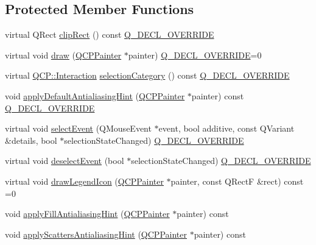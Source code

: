 \subsection*{Protected Member Functions}
\begin{DoxyCompactItemize}
\item 
virtual Q\+Rect \mbox{\hyperlink{class_q_c_p_abstract_plottable_a635cee3effc07ad421414c76fd83548c}{clip\+Rect}} () const \mbox{\hyperlink{qcustomplot_8h_a42cc5eaeb25b85f8b52d2a4b94c56f55}{Q\+\_\+\+D\+E\+C\+L\+\_\+\+O\+V\+E\+R\+R\+I\+DE}}
\item 
virtual void \mbox{\hyperlink{class_q_c_p_abstract_plottable_a453f676a5cee7bf846c5f0fa05ea84b3}{draw}} (\mbox{\hyperlink{class_q_c_p_painter}{Q\+C\+P\+Painter}} $\ast$painter) \mbox{\hyperlink{qcustomplot_8h_a42cc5eaeb25b85f8b52d2a4b94c56f55}{Q\+\_\+\+D\+E\+C\+L\+\_\+\+O\+V\+E\+R\+R\+I\+DE}}=0
\item 
virtual \mbox{\hyperlink{namespace_q_c_p_a2ad6bb6281c7c2d593d4277b44c2b037}{Q\+C\+P\+::\+Interaction}} \mbox{\hyperlink{class_q_c_p_abstract_plottable_af80ad8531642e786b6f4fad551c203c4}{selection\+Category}} () const \mbox{\hyperlink{qcustomplot_8h_a42cc5eaeb25b85f8b52d2a4b94c56f55}{Q\+\_\+\+D\+E\+C\+L\+\_\+\+O\+V\+E\+R\+R\+I\+DE}}
\item 
void \mbox{\hyperlink{class_q_c_p_abstract_plottable_ac032077fb0db93d6faa3273d02363398}{apply\+Default\+Antialiasing\+Hint}} (\mbox{\hyperlink{class_q_c_p_painter}{Q\+C\+P\+Painter}} $\ast$painter) const \mbox{\hyperlink{qcustomplot_8h_a42cc5eaeb25b85f8b52d2a4b94c56f55}{Q\+\_\+\+D\+E\+C\+L\+\_\+\+O\+V\+E\+R\+R\+I\+DE}}
\item 
virtual void \mbox{\hyperlink{class_q_c_p_abstract_plottable_a2d488568cf16600dd81fa23d7d439829}{select\+Event}} (Q\+Mouse\+Event $\ast$event, bool additive, const Q\+Variant \&details, bool $\ast$selection\+State\+Changed) \mbox{\hyperlink{qcustomplot_8h_a42cc5eaeb25b85f8b52d2a4b94c56f55}{Q\+\_\+\+D\+E\+C\+L\+\_\+\+O\+V\+E\+R\+R\+I\+DE}}
\item 
virtual void \mbox{\hyperlink{class_q_c_p_abstract_plottable_a9b104d9da4f38f934363945c313bf82e}{deselect\+Event}} (bool $\ast$selection\+State\+Changed) \mbox{\hyperlink{qcustomplot_8h_a42cc5eaeb25b85f8b52d2a4b94c56f55}{Q\+\_\+\+D\+E\+C\+L\+\_\+\+O\+V\+E\+R\+R\+I\+DE}}
\item 
virtual void \mbox{\hyperlink{class_q_c_p_abstract_plottable_a9a450783fd9ed539e589999fd390cdf7}{draw\+Legend\+Icon}} (\mbox{\hyperlink{class_q_c_p_painter}{Q\+C\+P\+Painter}} $\ast$painter, const Q\+RectF \&rect) const =0
\item 
void \mbox{\hyperlink{class_q_c_p_abstract_plottable_a8d06a59ea23324cce6330ebf2262c0ed}{apply\+Fill\+Antialiasing\+Hint}} (\mbox{\hyperlink{class_q_c_p_painter}{Q\+C\+P\+Painter}} $\ast$painter) const
\item 
void \mbox{\hyperlink{class_q_c_p_abstract_plottable_ac95f26b15a1e5d9c7bd2c0a46d760fc9}{apply\+Scatters\+Antialiasing\+Hint}} (\mbox{\hyperlink{class_q_c_p_painter}{Q\+C\+P\+Painter}} $\ast$painter) const
\end{DoxyCompactItemize}
